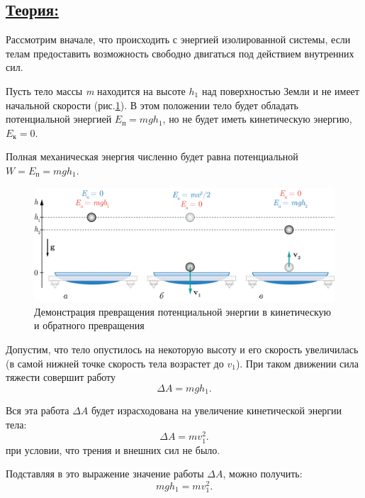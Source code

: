 \documentclass[14pt,a4paper,oneside]{extarticle}	%
\begin{document}
\subsection*{\underline{Теория:}}

Рассмотрим вначале, что происходить с энергией изолированной системы, если телам предоставить возможность свободно двигаться под действием внутренних сил. 

Пусть тело массы \textit{m} находится на высоте $ h_1 $ над поверхностью 
Земли и не имеет начальной скорости (рис.\ref{transform-3}). 
В этом положении тело будет обладать потенциальной энергией $ E_\text{п}=mgh_1 $, но не будет иметь кинетическую энергию, $ E_\text{к}=0 $. 

Полная механическая энергия численно будет равна потенциальной $W = E_\text{п} =mgh_1$.

\begin{figure}[H] 
	\centering 	
	\includegraphics[width=0.9\linewidth]{transform-3.png}
	\caption{Демонстрация превращения потенциальной энергии в кинетическую и обратного превращения}
	\label{transform-3}
\end{figure}

Допустим, что тело опустилось на некоторую высоту и его скорость увеличилась (в самой нижней точке скорость тела возрастет до $ v_1 $).
При таком движении сила тяжести совершит работу
\begin{equation}
\Delta A=mgh_1.
\end{equation}

Вся эта работа $ \Delta A  $ будет израсходована на увеличение кинетической энергии тела: 
\begin{equation}
\Delta A=mv_1^2.
\end{equation}
при условии, что трения и внешних сил не было. 

Подставляя в это выражение значение работы $ \Delta A $, можно получить: 
\begin{equation}
mgh_1=mv_1^2.
\end{equation}
\end{document}
